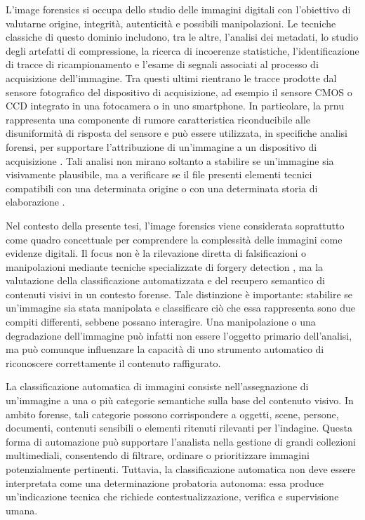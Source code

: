 L'image forensics si occupa dello studio delle immagini digitali con l'obiettivo di valutarne origine, integrità, autenticità e possibili manipolazioni. Le tecniche classiche di questo dominio includono, tra le altre, l'analisi dei metadati, lo studio degli artefatti di compressione, la ricerca di incoerenze statistiche, l'identificazione di tracce di ricampionamento e l'esame di segnali associati al processo di acquisizione dell'immagine. Tra questi ultimi rientrano le tracce prodotte dal sensore fotografico del dispositivo di acquisizione, ad esempio il sensore CMOS o CCD integrato in una fotocamera o in uno smartphone. In particolare, la \gls{prnu} rappresenta una componente di rumore caratteristica riconducibile alle disuniformità di risposta del sensore e può essere utilizzata, in specifiche analisi forensi, per supportare l'attribuzione di un'immagine a un dispositivo di acquisizione \cite{lukas2006prnu}. Tali analisi non mirano soltanto a stabilire se un'immagine sia visivamente plausibile, ma a verificare se il file presenti elementi tecnici compatibili con una determinata origine o con una determinata storia di elaborazione \cite{popescu2005exposing,farid2016photo}.

Nel contesto della presente tesi, l'image forensics viene considerata soprattutto come quadro concettuale per comprendere la complessità delle immagini come evidenze digitali. Il focus non è la rilevazione diretta di falsificazioni o manipolazioni mediante tecniche specializzate di forgery detection \cite{cozzolino2017recasting}, ma la valutazione della classificazione automatizzata e del recupero semantico di contenuti visivi in un contesto forense. Tale distinzione è importante: stabilire se un'immagine sia stata manipolata e classificare ciò che essa rappresenta sono due compiti differenti, sebbene possano interagire. Una manipolazione o una degradazione dell'immagine può infatti non essere l'oggetto primario dell'analisi, ma può comunque influenzare la capacità di uno strumento automatico di riconoscere correttamente il contenuto raffigurato.

La classificazione automatica di immagini consiste nell'assegnazione di un'immagine a una o più categorie semantiche sulla base del contenuto visivo. In ambito forense, tali categorie possono corrispondere a oggetti, scene, persone, documenti, contenuti sensibili o elementi ritenuti rilevanti per l'indagine. Questa forma di automazione può supportare l'analista nella gestione di grandi collezioni multimediali, consentendo di filtrare, ordinare o prioritizzare immagini potenzialmente pertinenti. Tuttavia, la classificazione automatica non deve essere interpretata come una determinazione probatoria autonoma: essa produce un'indicazione tecnica che richiede contestualizzazione, verifica e supervisione umana.

